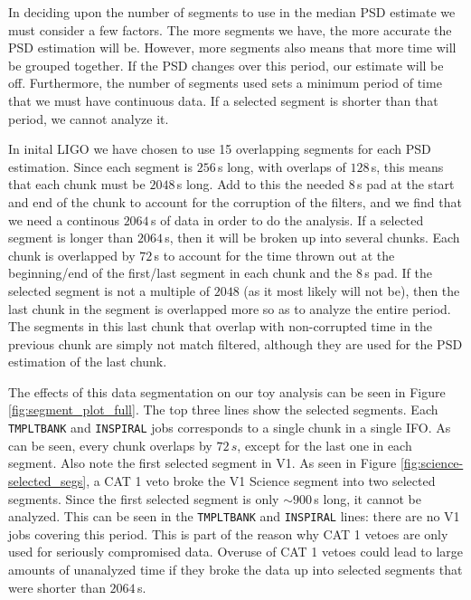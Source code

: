 In deciding upon the number of segments to use in the median \ac{PSD} estimate we must consider a few factors. The more segments we have, the more accurate the \ac{PSD} estimation will be. However, more segments also means that more time will be grouped together. If the \ac{PSD} changes over this period, our estimate will be off. Furthermore, the number of segments used sets a minimum period of time that we must have continuous data. If a selected segment is shorter than that period, we cannot analyze it. 

In inital \ac{LIGO} we have chosen to use 15 overlapping segments for each \ac{PSD} estimation. Since each segment is $256\,$s long, with overlaps of $128\,$s, this means that each chunk must be $2048\,$s long. Add to this the needed $8\,$s pad at the start and end of the chunk to account for the corruption of the filters, and we find that we need a continous $2064\,$s of data in order to do the analysis. If a selected segment is longer than $2064\,$s, then it will be broken up into several chunks. Each chunk is overlapped by $72\,$s to account for the time thrown out at the beginning/end of the first/last segment in each chunk and the $8\,$s pad. If the selected segment is not a multiple of $2048$ (as it most likely will not be), then the last chunk in the segment is overlapped more so as to analyze the entire period. The segments in this last chunk that overlap with non-corrupted time in the previous chunk are simply not match filtered, although they are used for the \ac{PSD} estimation of the last chunk.

The effects of this data segmentation on our toy analysis can be seen in Figure \ref{fig:segment_plot_full}. The top three lines show the selected segments. Each \texttt{TMPLTBANK} and \texttt{INSPIRAL} jobs corresponds to a single chunk in a single \ac{IFO}. As can be seen, every chunk overlaps by $72\,s$, except for the last one in each segment. Also note the first selected segment in V1. As seen in Figure \ref{fig:science-selected_segs}, a CAT 1 veto broke the V1 Science segment into two selected segments. Since the first selected segment is only $\sim900\,$s long, it cannot be analyzed. This can be seen in the \texttt{TMPLTBANK} and \texttt{INSPIRAL} lines: there are no V1 jobs covering this period. This is part of the reason why CAT 1 vetoes are only used for seriously compromised data. Overuse of CAT 1 vetoes could lead to large amounts of unanalyzed time if they broke the data up into selected segments that were shorter than $2064\,$s.

